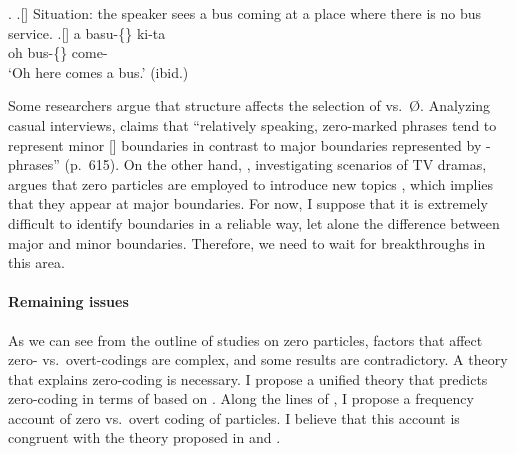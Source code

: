 \ex.
 \a.[] Situation: the speaker sees a bus coming at a place
       where there is no bus service.
 \bg.[] a basu-\{\} ki-ta \\
      oh bus-\{\} come- \\
      `Oh here comes a bus.'
      \hfill{(ibid.)}


Some researchers argue that
 structure affects the selection of  vs.~{\O}.
Analyzing casual interviews, 
claims that
``relatively speaking, zero-marked phrases tend to represent
minor [] boundaries in contrast to major boundaries represented
by -phrases'' (p.~615).
On the other hand,
,
investigating scenarios of TV dramas,
argues that zero particles are employed to introduce new topics
\cite[see also][]{niwa06},
which implies that they appear at major  boundaries.
For now,
I suppose that it is extremely difficult to identify  boundaries in a reliable way,
let alone the difference between major and minor boundaries.
Therefore, we need to wait for breakthroughs in this area.

\paragraph{Remaining issues}

As we can see from the outline of studies on zero particles,
factors that affect zero- vs.~overt-codings are complex,
and some results are contradictory.
A theory that explains zero-coding is necessary.
I propose a unified theory that predicts zero-coding in terms of
based on .
Along the lines of ,
I propose a frequency account of zero vs.~overt coding of particles.
I believe that this account is congruent with
the theory proposed in  and .



